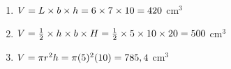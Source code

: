 \begin{exercises}{}
{}
\end{exercises}


 \begin{solutions}{}{
\begin{enumerate}[itemsep=5pt, label=\textbf{\arabic*}. ] 
\item $V = L \times b \times h \\
= 6 \times 7 \times 10 \\
= 420 ~$cm$^3$
\item $V = \frac{1}{2} \times h \times b \times H\\
= \frac{1}{2} \times 5 \times 10 \times 20 \\
=500 ~$cm$^3$
\item $V = \pi r^2 h \\
= \pi(5)^2(10)\\
= 785,4 ~$cm$^{3}$
\end{enumerate}}
\end{solutions}


